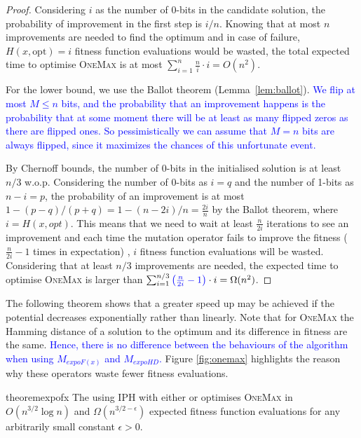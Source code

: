 \documentclass[lettersize,journal]{IEEEtran}
\newcommand{\new}[1]{\textcolor{blue}{#1}}
\begin{document}
\begin{proof}
Considering $i$ as the number of 0-bits in the candidate solution, the probability of improvement in the first step is $i/n$. Knowing that at most $n$ improvements are needed to find the optimum and in case of failure, $H(x,\text{opt})=i$ fitness function evaluations would be wasted, the total expected time to optimise \textsc{OneMax} is at most $\sum_{i=1}^n \frac{n}{i} \cdot i =O(n^2)$.

For the lower bound, we use the Ballot theorem (Lemma~\ref{lem:ballot}). 
\new{We flip at most $M \le n$ bits, and the probability that an improvement happens is the probability that at some moment there will be at least as many flipped zeros as there are flipped ones. So pessimistically we can assume that  $M = n$ bits are always flipped, since it maximizes the chances of this unfortunate event.} 

By Chernoff bounds, the number of 0-bits in the initialised solution is at least $n/3$ w.o.p. Considering the number of 
0-bits as $i=q$ and the number of 1-bits as $n-i=p$, the probability of 
an improvement is at most $1-(p-q)/(p+q)=1-(n-2i)/n=\frac{2i}{n}$ by the Ballot theorem, where $i=H(x, opt)$. This means that we need to wait at least $\frac{n}{2i}$ iterations to see an improvement and each time the mutation operator fails to improve the fitness {(\color{blue}$\frac{n}{2i} - 1$ times in expectation) }, $i$ fitness function evaluations will be wasted. Considering that at least $n/3$ improvements are needed, the expected time to optimise \textsc{OneMax} is larger than $\sum_{i=1}^{n/3} {\color{blue}\left(\frac{n}{2i}-1\right)} \cdot i= \Omega(n^2)$.
\end{proof}

The following theorem shows that a greater speed up may be achieved if the potential decreases exponentially rather than linearly. Note that for \textsc{OneMax} the Hamming distance of a solution to the optimum and its difference in fitness are the same. %
\new{Hence, there is no difference between the behaviours of the algorithm when using $M_{expoF(x)}$ and $M_{expoHD}$.} 
Figure \ref{fig:onemax} highlights the reason why these operators waste fewer fitness evaluations.

\begin{restatable}{theorem}{expofx} \label{cor:omexpohd}
The {\oneoneIA } using IPH with either {\expoF } or {\expoHD } optimises \textsc{OneMax} in $O(n^{3/2} \log 
n)$ and $\Omega(n^{3/2-\epsilon})$ expected fitness function evaluations for 
any arbitrarily small constant $\epsilon>0$.
\end{restatable}
\end{document}

